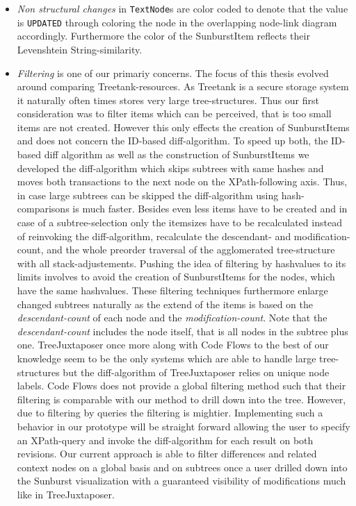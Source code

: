 \begin{itemize}
\item \emph{Non structural changes} in \texttt{TextNode}s are color coded to denote that the value is \texttt{UPDATED} through coloring the node in the overlapping node-link diagram accordingly. Furthermore the color of the SunburstItem reflects their Levenshtein String-similarity.
\item \emph{Filtering} is one of our primariy concerns. The focus of this thesis evolved around comparing Treetank-resources. As Treetank is a secure storage system it naturally often times stores very large tree-structures. Thus our first consideration was to filter items which can be perceived, that is too small items are not created. However this only effects the creation of SunburstItems and does not concern the ID-based diff-algorithm. To speed up both, the ID-based diff algorithm as well as the construction of SunburstItems we developed the diff-algorithm which skips subtrees with same hashes and moves both transactions to the next node on the XPath-following axis. Thus, in case large subtrees can be skipped the diff-algorithm using hash-comparisons is much faster. Besides even less items have to be created and in case of a subtree-selection only the itemsizes have to be recalculated instead of reinvoking the diff-algorithm, recalculate the descendant- and modification-count, and the whole preorder traversal of the agglomerated tree-structure with all stack-adjustements. Pushing the idea of filtering by hashvalues to its limits involves to avoid the creation of SunburstItems for the nodes, which have the same hashvalues. These filtering techniques furthermore enlarge changed subtrees naturally as the extend of the items is based on the \emph{descendant-count} of each node and the \emph{modification-count}. Note that the \emph{descendant-count} includes the node itself, that is all nodes in the subtree plus one. TreeJuxtaposer once more along with Code Flows to the best of our knowledge seem to be the only systems which are able to handle large tree-structures but the diff-algorithm of TreeJuxtaposer relies on unique node labels. Code Flows does not provide a global filtering method such that their filtering is comparable with our method to drill down into the tree. However, due to filtering by queries the filtering is mightier. Implementing such a behavior in our prototype will be straight forward allowing the user to specify an XPath-query and invoke the diff-algorithm for each result on both revisions. Our current approach is able to filter differences and related context nodes on a global basis and on subtrees once a user drilled down into the Sunburst visualization with a guaranteed visibility of modifications much like in TreeJuxtaposer.
\end{itemize}

